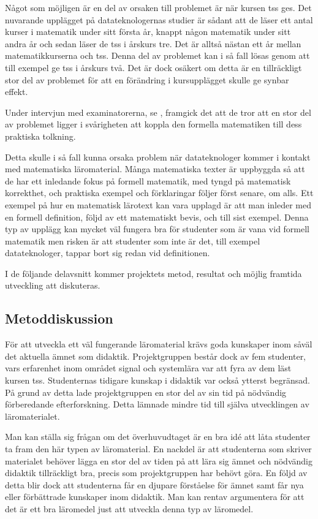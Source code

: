 \documentclass[12pt,a4paper,twoside,openright]{article}
\begin{document}
Något som möjligen är en del av orsaken till problemet är när kursen
\gls{tss} ges. Det nuvarande upplägget på datateknologernas studier
är sådant att de läser ett antal kurser i matematik under sitt första
år, knappt någon matematik under sitt andra år och sedan läser de
\gls{tss} i årskurs tre. Det är alltså nästan ett år mellan
matematikkurserna och \gls{tss}. Denna del av problemet kan i så
fall lösas genom att till exempel ge \gls{tss} i årskurs två. Det är dock
osäkert om detta är en tillräckligt stor del av problemet för att en
förändring i kursupplägget skulle ge synbar effekt.

Under intervjun med examinatorerna, se ,
framgick det att de tror att en stor del av problemet ligger i
svårigheten att koppla den formella matematiken till dess praktiska
tolkning.

Detta skulle i så fall kunna orsaka problem när datateknologer kommer
i kontakt med matematiska läromaterial. Många matematiska texter är
uppbyggda så att de har ett inledande fokus på formell matematik, med
tyngd på matematisk korrekthet, och praktiska exempel och förklaringar
följer först senare, om alls. Ett exempel på hur en matematisk
lärotext kan vara upplagd är att man inleder med en formell
definition, följd av ett matematiskt bevis, och till sist
exempel. Denna typ av upplägg kan mycket väl fungera bra för studenter
som är vana vid formell matematik men risken är att studenter som inte
är det, till exempel datateknologer, tappar bort sig redan vid
definitionen.

I de följande delavsnitt kommer projektets metod, resultat och möjlig
framtida utveckling att diskuteras.

\subsection{Metoddiskussion}
\label{sec:metDisk}
För att utveckla ett väl fungerande läromaterial krävs goda kunskaper
inom såväl det aktuella ämnet som didaktik. Projektgruppen består dock
av fem studenter, vars erfarenhet inom området signal och systemlära
var att fyra av dem läst kursen \gls{tss}. Studenternas tidigare
kunskap i didaktik var också ytterst begränsad. På grund av detta lade
projekt\-gruppen en stor del av sin tid på nödvändig förberedande
efterforskning. Detta lämnade mindre tid till själva utvecklingen av
läromaterialet.

Man kan ställa sig frågan om det överhuvudtaget är en bra idé att låta
studenter ta fram den här typen av läromaterial. En nackdel är att
studenterna som skriver materialet behöver lägga en stor del av tiden
på att lära sig ämnet och nödvändig didaktik tillräckligt bra, precis
som projektgruppen har behövt göra.  En följd av detta blir dock att
studenterna får en djupare förståelse för ämnet samt får nya eller
förbättrade kunskaper inom didaktik.  Man kan rentav argumentera för
att det är ett bra läromedel just att utveckla denna typ av läromedel.
\end{document}
